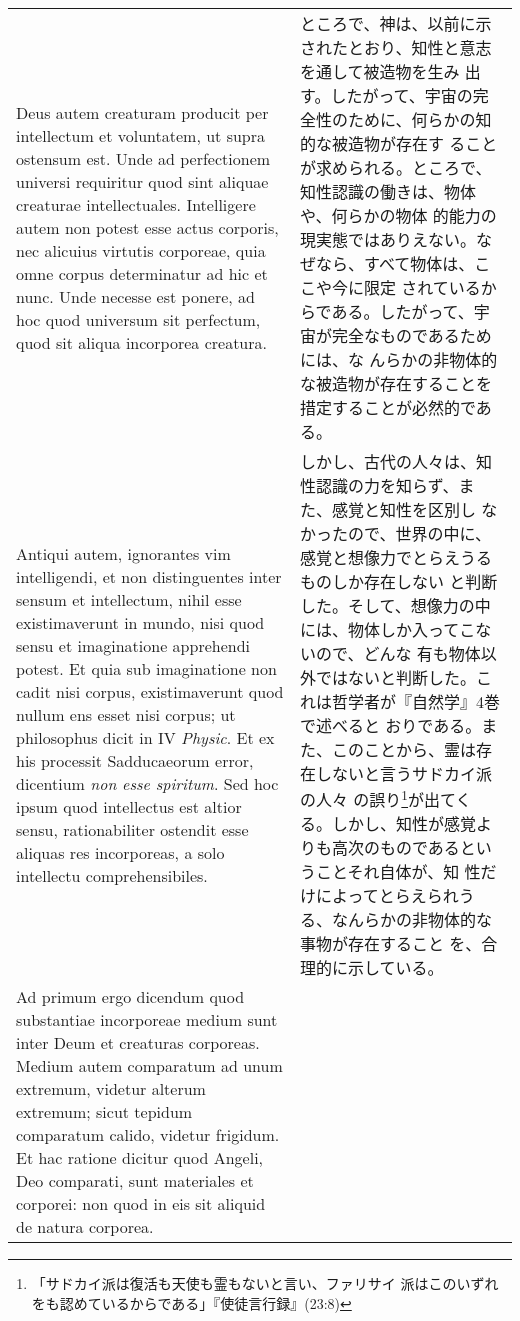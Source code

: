 \documentclass[10pt]{jsarticle} %
\begin{document}
\begin{longtable}{p{21em}p{21em}}
\\

Deus autem creaturam producit per intellectum et voluntatem, ut supra
ostensum est. Unde ad perfectionem universi requiritur quod sint
aliquae creaturae intellectuales. Intelligere autem non potest esse
actus corporis, nec alicuius virtutis corporeae, quia omne corpus
determinatur ad hic et nunc. Unde necesse est ponere, ad hoc quod
universum sit perfectum, quod sit aliqua incorporea creatura.

&

 ところで、神は、以前に示されたとおり、知性と意志を通して被造物を生み
 出す。したがって、宇宙の完全性のために、何らかの知的な被造物が存在す
 ることが求められる。ところで、知性認識の働きは、物体や、何らかの物体
 的能力の現実態ではありえない。なぜなら、すべて物体は、ここや今に限定
 されているからである。したがって、宇宙が完全なものであるためには、な
 んらかの非物体的な被造物が存在することを措定することが必然的である。

\\

Antiqui autem, ignorantes vim intelligendi, et non distinguentes inter
sensum et intellectum, nihil esse existimaverunt in mundo, nisi quod
sensu et imaginatione apprehendi potest. Et quia sub imaginatione non
cadit nisi corpus, existimaverunt quod nullum ens esset nisi corpus;
ut philosophus dicit in IV {\itshape Physic}. Et ex his processit
Sadducaeorum error, dicentium {\itshape non esse spiritum}. Sed hoc
ipsum quod intellectus est altior sensu, rationabiliter ostendit esse
aliquas res incorporeas, a solo intellectu comprehensibiles.

&

 しかし、古代の人々は、知性認識の力を知らず、また、感覚と知性を区別し
 なかったので、世界の中に、感覚と想像力でとらえうるものしか存在しない
 と判断した。そして、想像力の中には、物体しか入ってこないので、どんな
 有も物体以外ではないと判断した。これは哲学者が『自然学』4巻で述べると
 おりである。また、このことから、霊は存在しないと言うサドカイ派の人々
 の誤り\footnote{「サドカイ派は復活も天使も霊もないと言い、ファリサイ
 派はこのいずれをも認めているからである」『使徒言行録』(23:8)}が出てく
 る。しかし、知性が感覚よりも高次のものであるということそれ自体が、知
 性だけによってとらえられうる、なんらかの非物体的な事物が存在すること
 を、合理的に示している。

\\


Ad primum ergo dicendum quod substantiae incorporeae medium sunt inter
Deum et creaturas corporeas. Medium autem comparatum ad unum extremum,
videtur alterum extremum; sicut tepidum comparatum calido, videtur
frigidum. Et hac ratione dicitur quod Angeli, Deo comparati, sunt
materiales et corporei: non quod in eis sit aliquid de natura
corporea.


\end{longtable}
\end{document}
